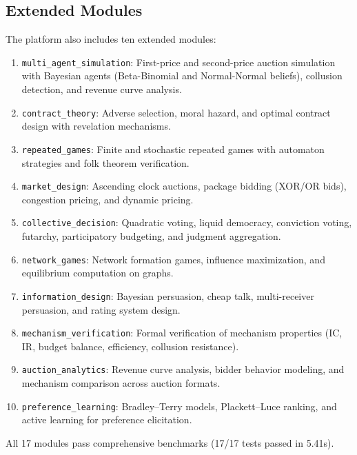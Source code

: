 \documentclass[10pt]{article}
\begin{document}
\subsection{Extended Modules}

The platform also includes ten extended modules:

\begin{enumerate}[leftmargin=*,itemsep=1pt]
  \item \texttt{multi\_agent\_simulation}: First-price and second-price auction simulation with Bayesian agents (Beta-Binomial and Normal-Normal beliefs), collusion detection, and revenue curve analysis.
  \item \texttt{contract\_theory}: Adverse selection, moral hazard, and optimal contract design with revelation mechanisms.
  \item \texttt{repeated\_games}: Finite and stochastic repeated games with automaton strategies and folk theorem verification.
  \item \texttt{market\_design}: Ascending clock auctions, package bidding (XOR/OR bids), congestion pricing, and dynamic pricing.
  \item \texttt{collective\_decision}: Quadratic voting, liquid democracy, conviction voting, futarchy, participatory budgeting, and judgment aggregation.
  \item \texttt{network\_games}: Network formation games, influence maximization, and equilibrium computation on graphs.
  \item \texttt{information\_design}: Bayesian persuasion, cheap talk, multi-receiver persuasion, and rating system design.
  \item \texttt{mechanism\_verification}: Formal verification of mechanism properties (IC, IR, budget balance, efficiency, collusion resistance).
  \item \texttt{auction\_analytics}: Revenue curve analysis, bidder behavior modeling, and mechanism comparison across auction formats.
  \item \texttt{preference\_learning}: Bradley--Terry models, Plackett--Luce ranking, and active learning for preference elicitation.
\end{enumerate}

All 17 modules pass comprehensive benchmarks (17/17 tests passed in 5.41s).

\end{document}
